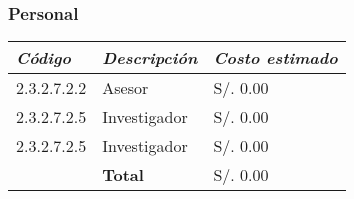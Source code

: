     \subsubsection{Personal}
        \begin{table}[h!]
            \centering
            \begin{tabular}{|p{3cm}|p{3cm}|p{3cm}|} \hline
                 
            
            \textit{{\bf{Código}}} &
            \textit{{\bf{Descripción}}} &
            \textit{{\bf{Costo estimado}}}
            \\ \hline

            2.3.2.7.2.2 &
            Asesor &
            S/. 0.00
            \\ \hline

            2.3.2.7.2.5 &
            Investigador &
            S/. 0.00
            \\ \hline

            2.3.2.7.2.5 &
            Investigador &
            S/. 0.00
            \\ \hline

             &
            \bf{Total} &
            S/. 0.00
            \\ \hline


            \end{tabular}
        \end{table}
